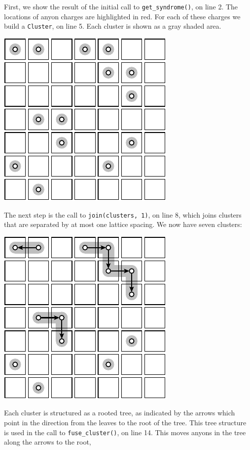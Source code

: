 \documentclass[aps, prl, letterpaper, twocolumn, superscriptaddress, notitlepage, 10pt]{revtex4-1}
\begin{document}
First, we show the result of the initial call to {\tt get\_syndrome()}, on line 2.
The locations of anyon charges are highlighted in red.
For each of these charges we build a {\tt Cluster}, on line 5.
Each cluster is shown as a gray shaded area.
\begin{center}
\includegraphics[]{pic-decode-0.pdf}
\end{center}
The next step is the call to {\tt join(clusters, 1)}, on line 8,
which joins clusters that are separated by at most one lattice
spacing. We now have seven clusters:
\begin{center}
\includegraphics[]{pic-decode-1.pdf}
\end{center}
Each cluster is structured as a rooted tree, as indicated by
the arrows which point in the direction from the leaves to
the root of the tree. 
This tree structure is used in the call to {\tt fuse\_cluster()},
on line 14.
This moves anyons in the tree along the arrows to the root, 
\end{document}
